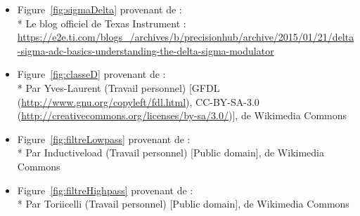 \documentclass[10pt, oneside, a4paper]{article}
\begin{document}
\begin{itemize}
\item Figure~\ref{fig:sigmaDelta} provenant de :\\*
Le blog officiel de Texas Instrument :
\url{https://e2e.ti.com/blogs_/archives/b/precisionhub/archive/2015/01/21/delta-sigma-adc-basics-understanding-the-delta-sigma-modulator}

\item Figure~\ref{fig:classeD} provenant de :\\*
Par Yves-Laurent (Travail personnel) [GFDL (\url{http://www.gnu.org/copyleft/fdl.html}),
CC-BY-SA-3.0 (\url{http://creativecommons.org/licenses/by-sa/3.0/})], de Wikimedia Commons

\item Figure~\ref{fig:filtreLowpass} provenant de :\\*
Par Inductiveload (Travail personnel) [Public domain], de Wikimedia Commons

\item Figure~\ref{fig:filtreHighpass} provenant de :\\*
Par Toriicelli (Travail personnel) [Public domain], de Wikimedia Commons
\end{itemize}




\appendix



\end{document}
